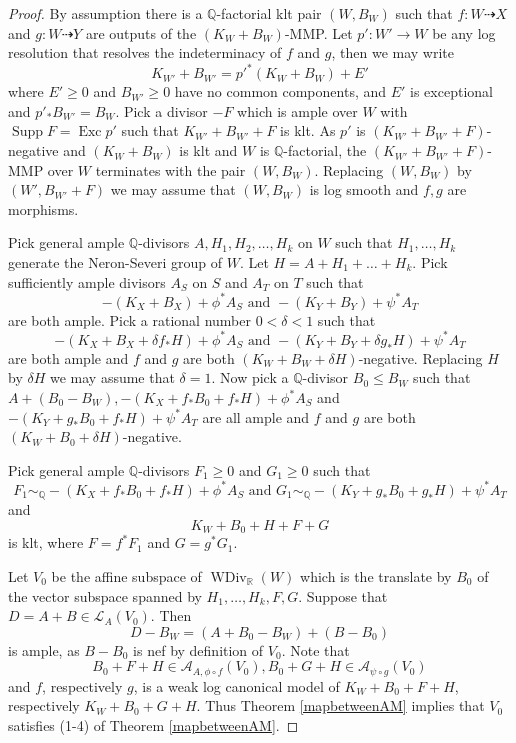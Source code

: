 \documentclass[11pt]{amsart}
\begin{document}
\begin{proof}
  By assumption there is a $\mathbb{Q}$-factorial klt pair $(W,B_{W})$ such that $f:W\dashrightarrow X$ and $g:W \dashrightarrow Y$ are  outputs of the $(K_{W}+B_{W})$-MMP. Let $p':W'\to W$ be any log resolution  that resolves the indeterminacy of $f$ and $g$, then we may write
  \[
    K_{W'}+B_{W'}=p'^*(K_{W}+B_{W})+E'
  \]
where $E'\geqslant 0$ and $B_{W'}\geqslant 0$ have no common components, and $E'$ is exceptional and $p'_*B_{W'}=B_{W}$. Pick a divisor $-F$ which is ample over $W$ with $\operatorname{Supp}F=\operatorname{Exc}p'$ such that $K_{W'}+B_{W'}+F$ is klt. As $p'$ is $(K_{W'}+
B_{W'}+F)$-negative and $(K_{W}+B_{W})$ is klt and $W$ is $\mathbb{Q}$-factorial, the $(K_{W'}+B_{W'}+F)$-MMP over $W$ terminates with the pair $(W,B_{W})$. Replacing $(W,B_{W})$ by $(W',B_{W'} +F)$ we may assume that $(W,B_{W})$ is log smooth and $f,g$ are morphisms.

Pick general ample $\mathbb{Q}$-divisors $A, H_{1},H_{2},\ldots ,H_{k}$ on $W$ such that $H_{1},\ldots , H_{k}$ generate the Neron-Severi group of $W$. Let $H=A+H_{1}+\ldots+ H_{k}$. Pick sufficiently ample divisors $A_{S}$ on $S$ and $A_{T}$ on $T$ such that
\[
-(K_{X}+B_{X})+\phi^*A_{S} \text{ and } -(K_{Y}+B_{Y})+\psi^*A_{T}
\]
are both ample. Pick a rational number $0<\delta<1$ such that 
\[
  -(K_{X}+B_{X}+\delta f_*H)+\phi^*A_{S} \text{ and } -(K_{Y}+B_{Y}+\delta g_*H)+\psi^*A_{T}
\]
are both ample and  $f$ and  $g$ are both  $(K_{W}+B_{W}+\delta H)$-negative. Replacing $H$ by $\delta H$ we may assume that $\delta=1$. Now pick a $\mathbb{Q}$-divisor $B_{0}\leqslant B_{W}$ such that $A+(B_{0}-B_{W}), -(K_{X}+ f_*B_{0}+f_*H)+\phi^*A_{S}$ and $-(K_{Y}+ g_*B_{0}+f_*H)+\psi^*A_{T}$  are all ample and $f$ and  $g$ are both  $(K_{W}+B_{0}+\delta H)$-negative.

Pick general ample $\mathbb{Q}$-divisors $F_{1}\geqslant 0$ and $G_{1}\geqslant 0$  such that
\[
F_{1}\sim_{\mathbb{Q}} -(K_{X}+f_*B_{0}+ f_*H)+\phi^*A_{S} \text{ and } G_{1}\sim_{\mathbb{Q}} -(K_{Y}+g_*B_{0}+ g_*H)+\psi^*A_{T}
\]
and 
\[
  K_{W}+B_{0}+H+F+G
\]
is klt, where $F=f^*F_{1}$ and $G=g^*G_{1}$. 

Let $V_{0}$ be the affine subspace of $\operatorname{WDiv}_{\mathbb{R}}(W)$ which is the translate by $B_{0}$ of the vector subspace  spanned by $H_{1},\ldots , H_{k},F,G$. Suppose that $D=A+B \in \mathcal{L}_{A}(V_{0})$. Then 
\[
  D-B_W=(A+B_{0}-B_{W})+(B-B_{0})
\]
is ample, as $B-B_{0}$ is nef by definition of $V_{0}$. Note that
\[
  B_{0}+F+H \in \mathcal{A}_{A,\phi\circ f}(V_{0}), B_{0}+G+H \in \mathcal{A}_{\psi \circ g}(V_{0})
\]
and $f$, respectively $g$, is a weak log canonical model of $K_{W}+B_{0}+F+H$, respectively $K_{W}+B_{0}+G+H$. Thus Theorem \ref{mapbetweenAM} implies that $V_{0}$ satisfies (1-4) of Theorem \ref{mapbetweenAM}.


\end{proof}
\end{document}
